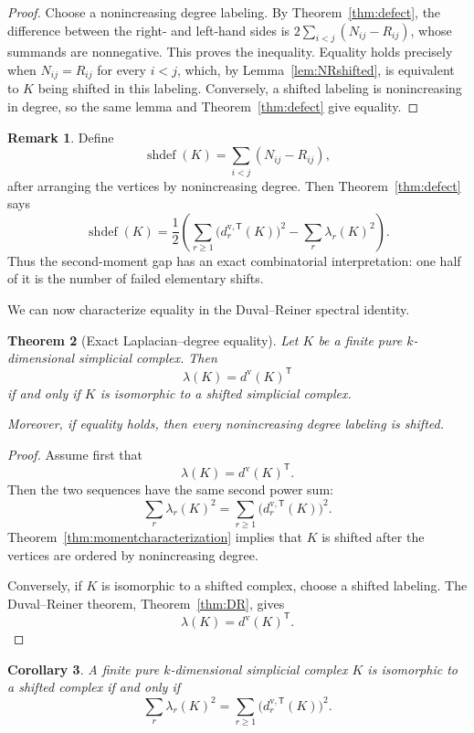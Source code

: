 \documentclass[11pt,reqno]{amsart}
\numberwithin{equation}{section}
\theoremstyle{plain}
\newtheorem{theorem}{Theorem}[section]
\newtheorem{corollary}[theorem]{Corollary}
\theoremstyle{definition}
\newtheorem{remark}[theorem]{Remark}
\newcommand{\T}{\mathsf{T}}
\begin{document}
\begin{proof}
Choose a nonincreasing degree labeling. By Theorem~\ref{thm:defect}, the difference between the
right- and left-hand sides is $2\sum_{i<j}(N_{ij}-R_{ij})$, whose summands are nonnegative.
This proves the inequality. Equality holds precisely when $N_{ij}=R_{ij}$ for every $i<j$,
which, by Lemma~\ref{lem:NRshifted}, is equivalent to $K$ being shifted in this labeling.
Conversely, a shifted labeling is nonincreasing in degree, so the same lemma and
Theorem~\ref{thm:defect} give equality.
\end{proof}

\begin{remark}
Define
\[
\operatorname{shdef}(K)
=\sum_{i<j}(N_{ij}-R_{ij}),
\]
after arranging the vertices by nonincreasing degree. Then Theorem~\ref{thm:defect} says
\[
\operatorname{shdef}(K)
=\frac12\left(
\sum_{r\ge1}\bigl(d^{\mathrm v,\T}_r(K)\bigr)^2
-\sum_r \lambda_r(K)^2
\right).
\]
Thus the second-moment gap has an exact combinatorial interpretation: one half of it is the
number of failed elementary shifts.
\end{remark}



We can now characterize equality in the Duval--Reiner spectral identity.

\begin{theorem}[Exact Laplacian--degree equality]\label{thm:exactshifted}
Let $K$ be a finite pure $k$-dimensional simplicial complex. Then
\[
\lambda(K)={d^{\mathrm v}(K)}^{\T}
\]
if and only if $K$ is isomorphic to a shifted simplicial complex.

Moreover, if equality holds, then every nonincreasing degree labeling is shifted.
\end{theorem}

\begin{proof}
Assume first that
\[
\lambda(K)={d^{\mathrm v}(K)}^{\T}.
\]
Then the two sequences have the same second power sum:
\[
\sum_r \lambda_r(K)^2
=
\sum_{r\ge1}\bigl(d^{\mathrm v,\T}_r(K)\bigr)^2.
\]
Theorem~\ref{thm:momentcharacterization} implies that $K$ is shifted after the vertices are
ordered by nonincreasing degree.

Conversely, if $K$ is isomorphic to a shifted complex, choose a shifted labeling. The
Duval--Reiner theorem, Theorem~\ref{thm:DR}, gives
\[
\lambda(K)={d^{\mathrm v}(K)}^{\T}.
\]
\end{proof}

\begin{corollary}\label{cor:weakerhypothesis}
A finite pure $k$-dimensional simplicial complex $K$ is isomorphic to a shifted complex if and
only if
\[
  \sum_r \lambda_r(K)^2
  =\sum_{r\ge1}\bigl(d^{\mathrm v,\T}_r(K)\bigr)^2.
\]
\end{corollary}
\end{document}
